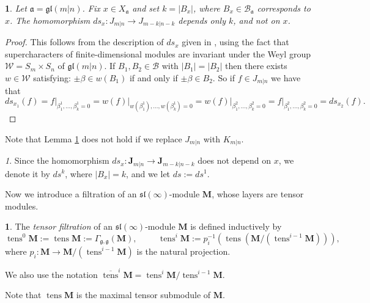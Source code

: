 \documentclass[12pt,oneside,english]{amsart}
\numberwithin{equation}{section}
\numberwithin{figure}{section}
\theoremstyle{plain}
\theoremstyle{plain}
\newtheorem{lem}[thm]{\protect\lemmaname}
\theoremstyle{remark}
\newtheorem{rem}[thm]{\protect\remarkname}
\theoremstyle{definition}
\newtheorem{defn}[thm]{\protect\definitionname}
\theoremstyle{plain}
\theoremstyle{remark}
\theoremstyle{definition}
\theoremstyle{plain}
\theoremstyle{plain}
\theoremstyle{definition}
\providecommand{\definitionname}{Definition}
\providecommand{\lemmaname}{Lemma}
\providecommand{\remarkname}{Remark}
\newcommand{\bJ}{\mathbf{J}}
\newcommand{\bM}{\mathbf{M}}
\newcommand{\tens}{\operatorname{tens}}
\newcommand{\fg}{\mathfrak{g}}
\newcommand{\fa}{\mathfrak{a}}
\begin{document}
\begin{lem}
\label{prop:independent} Let $\fa=\mathfrak{gl}(m|n)$. Fix $x\in X_{\fa}$ and set $k=|B_x|$, where $B_x\in \mathcal{B}_{\fa}$ corresponds to $x$. The homomorphism $ds_{x}:{J}_{m|n}\rightarrow{J}_{m-k|n-k}$ depends only $k$, and not on $x$.
\end{lem}
\begin{proof}
This follows from the description of $ds_{x}$ given in \cite[Theorem 10]{HR}, using the fact that supercharacters of finite-dimensional modules are invariant under the Weyl group $\mathcal W=S_m\times S_n$ of $\mathfrak{gl}(m|n)$. If $B_{1}, B_{2}\in\mathcal{B}$ with
$|B_{1}|=|B_{2}|$ then there exists $w\in\mathcal W$ satisfying: $\pm\beta\in w\left(B_{1}\right)$
if and only if $\pm\beta\in B_{2}$. So if $f\in{J}_{m|n}$
we have that
\[ds_{x_1}(f)=
f\vert_{\beta_{1}^{1},\ldots,\beta_{k}^{1}=0}=w\left(f\right)\vert_{w\left(\beta_{1}^{1}\right),\ldots,w\left(\beta_{k}^{1}\right)=0}=w\left(f\right)\vert_{\beta_{1}^{2},\ldots,\beta_{k}^{2}=0}=f\vert_{\beta_{1}^{2},\ldots,\beta_{k}^{2}=0}
=ds_{x_2}(f).\]
\end{proof}

Note that Lemma \ref{prop:independent} does not hold if we replace ${J}_{m|n}$ with ${K}_{m|n}$.

\begin{rem}\label{ds k} Since the homomorphism  $ds_{x}:\bJ_{m|n}\rightarrow\bJ_{m-k|n-k}$  does not depend on $x$, we denote it by  $ds^k$, where $|B_x|=k$, and
  we let $ds:=ds^1$.
\end{rem}

Now we introduce a filtration of an $\mathfrak{sl}(\infty)$-module $\bM$, whose layers are tensor modules.


\begin{defn}

The {\em tensor filtration} of an $\mathfrak{sl}(\infty)$-module $\bM$ is defined inductively by $$\tens^0\bM:=\tens \bM:=\Gamma_{\fg,\fg}(\bM), \hspace{1cm} \tens^{i} \bM:=p_i^{-1}(\tens(\bM/(\tens^{i-1}\bM))),$$
where $p_i:\bM\to \bM/(\tens^{i-1} \bM)$ is the natural projection.

We also use the notation $\overline{\tens}^i \bM=\tens^i \bM /\tens^{i-1}\bM$.
\end{defn}
Note that $\tens\bM$ is the maximal tensor submodule of $\bM$.
\end{document}
